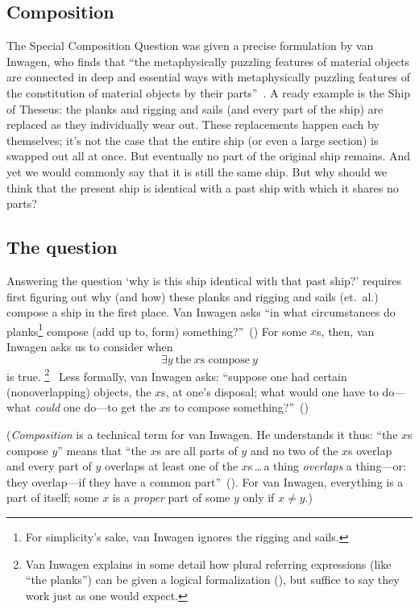 \documentclass[11pt]{article}
\begin{document}
\begin{spacing}{1.5}
\subsection{Composition}
\label{comp}
The Special Composition Question was given a precise formulation by van Inwagen, who finds that ``the metaphysically puzzling features of material objects are connected in deep and essential ways with metaphysically puzzling features of the constitution of material objects by their parts''~\citep[18]{inwagen1995}.  A ready example is the Ship of Theseus: the planks and rigging and sails (and every part of the ship) are replaced as they individually wear out.  These replacements happen each by themselves; it's not the case that the entire ship (or even a large section) is swapped out all at once.  But eventually no part of the original ship remains.  And yet we would commonly say that it is still the same ship.  But why should we think that the present ship is identical with a past ship with which it shares no parts?

\subsection{The question}
\label{scq}
Answering the question `why is this ship identical with that past ship?' requires first figuring out why (and how) these planks and rigging and sails (et.\ al.) compose a ship in the first place.  Van Inwagen asks ``in what circumstances do planks\footnote{For simplicity's sake, van Inwagen ignores the rigging and sails.} compose (add up to, form) something?''~(\citeyear[21]{inwagen1995}) For some $x$s, then, van Inwagen asks us to consider when
\begin{equation}
\exists y\ \text{the}\ x\text{s compose}\ y
\end{equation}
is true.%
\footnote{Van Inwagen explains in some detail how plural referring expressions (like ``the planks'') can be given a logical formalization (\citeyear[23--28]{inwagen1995}), but suffice to say they work just as one would expect.}%
%
\ Less formally, van Inwagen asks: ``suppose one had certain (nonoverlapping) objects, the $x$s, at one's disposal; what would one have to do---what {\em could} one do---to get the $x$s to compose something?''~(\citeyear[31]{inwagen1995})

({\em Composition} is a technical term for van Inwagen.  He understands it thus: ``the $x$s compose $y$'' means that ``the $x$s are all parts of $y$ and no two of the $x$s overlap and every part of $y$ overlaps at least one of the $x$s\,\ldots\,a thing {\em overlaps} a thing---or: they overlap---if they have a common part''~(\citeyear[29]{inwagen1995}).  For van Inwagen, everything is a part of itself; some $x$ is a {\em proper} part of some $y$ only if $x \neq y$.)


\end{spacing}
\end{document}
